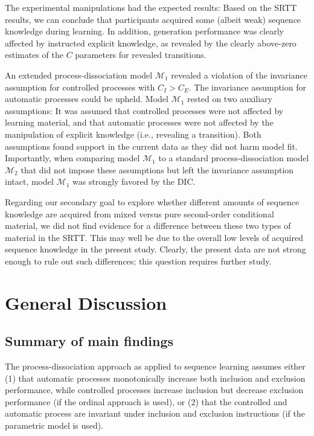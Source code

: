 \documentclass[jou]{apa6}
\theoremstyle{definition}
\theoremstyle{definition}
\theoremstyle{definition}
\theoremstyle{remark}
\begin{document}
The experimental manipulations had the expected results: Based on the
SRTT results, we can conclude that participants acquired some (albeit
weak) sequence knowledge during learning. In addition, generation
performance was clearly affected by instructed explicit knowledge, as
revealed by the clearly above-zero estimates of the \(C\) parameters for
revealed transitions.

An extended process-dissociation model \(\mathcal{M}_1\) revealed a
violation of the invariance assumption for controlled processes with
\(C_I > C_E\). The invariance assumption for automatic processes could
be upheld. Model \(\mathcal{M}_1\) rested on two auxiliary assumptions:
It was assumed that controlled processes were not affected by learning
material, and that automatic processes were not affected by the
manipulation of explicit knowledge (i.e., revealing a transition). Both
assumptions found support in the current data as they did not harm model
fit. Importantly, when comparing model \(\mathcal{M}_1\) to a standard
process-dissociation model \(\mathcal{M}_2\) that did not impose these
assumptions but left the invariance assumption intact, model
\(\mathcal{M}_1\) was strongly favored by the DIC.

Regarding our secondary goal to explore whether different amounts of
sequence knowledge are acquired from mixed versus pure second-order
conditional material, we did not find evidence for a difference between
these two types of material in the SRTT. This may well be due to the
overall low levels of acquired sequence knowledge in the present study.
Clearly, the present data are not strong enough to rule out such
differences; this question requires further study.

\section{General Discussion}\label{general-discussion}

\subsection{Summary of main findings}\label{summary-of-main-findings}

The process-dissociation approach as applied to sequence learning
assumes either (1) that automatic processes monotonically increase both
inclusion and exclusion performance, while controlled processes increase
inclusion but decrease exclusion performance (if the ordinal approach is
used), or (2) that the controlled and automatic process are invariant
under inclusion and exclusion instructions (if the parametric model is
used).
\end{document}
